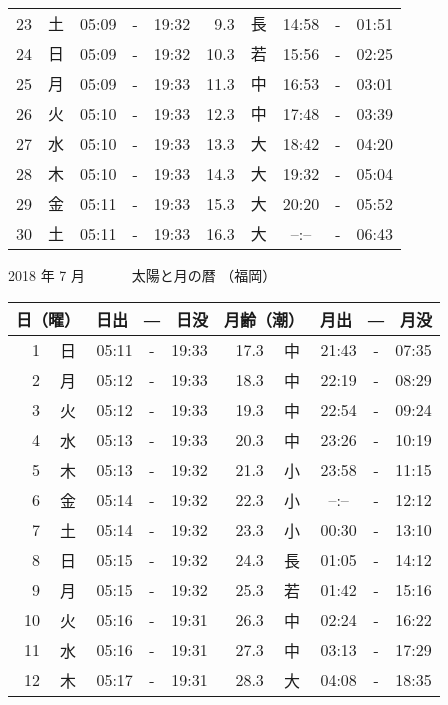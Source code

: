 \documentclass[a4j,10pt]{jsarticle}
\begin{document}
\begin{center}
\begin{table}[ht]
\begin{center}
\begin{tabular}{|rc|ccc|rc|ccc|}
 23 & 土 & 05:09 &-& 19:32 &  9.3 & 長 & 14:58 &-& 01:51 \\
 24 & 日 & 05:09 &-& 19:32 & 10.3 & 若 & 15:56 &-& 02:25 \\
 25 & 月 & 05:09 &-& 19:33 & 11.3 & 中 & 16:53 &-& 03:01 \\
 26 & 火 & 05:10 &-& 19:33 & 12.3 & 中 & 17:48 &-& 03:39 \\
 27 & 水 & 05:10 &-& 19:33 & 13.3 & 大 & 18:42 &-& 04:20 \\
 28 & 木 & 05:10 &-& 19:33 & 14.3 & 大 & 19:32 &-& 05:04 \\
 29 & 金 & 05:11 &-& 19:33 & 15.3 & 大 & 20:20 &-& 05:52 \\
 30 & 土 & 05:11 &-& 19:33 & 16.3 & 大 &  --:--  &-& 06:43 \\
    \hline
    \end{tabular}
    \end{center}
\end{table}
\newpage
  {\large 2018 年  7 月}
  {\Large 　　　太陽と月の暦   （福岡） }
  \begin{table}[ht]
  \begin{center}
     \begin{tabular}{|rc|ccc|rc|ccc|}
     \hline
     \multicolumn{2}{|c|}{日（曜）} & \multicolumn{3}{c|}{日出　―　日没} & \multicolumn{2}{c|}{月齢（潮）} & \multicolumn{3}{c|}{月出　―　月没}\\
     \hline
  1 & 日 & 05:11 &-& 19:33 & 17.3 & 中 & 21:43 &-& 07:35 \\
  2 & 月 & 05:12 &-& 19:33 & 18.3 & 中 & 22:19 &-& 08:29 \\
  3 & 火 & 05:12 &-& 19:33 & 19.3 & 中 & 22:54 &-& 09:24 \\
  4 & 水 & 05:13 &-& 19:33 & 20.3 & 中 & 23:26 &-& 10:19 \\
  5 & 木 & 05:13 &-& 19:32 & 21.3 & 小 & 23:58 &-& 11:15 \\
  6 & 金 & 05:14 &-& 19:32 & 22.3 & 小 &  --:--  &-& 12:12 \\
  7 & 土 & 05:14 &-& 19:32 & 23.3 & 小 & 00:30 &-& 13:10 \\
  8 & 日 & 05:15 &-& 19:32 & 24.3 & 長 & 01:05 &-& 14:12 \\
  9 & 月 & 05:15 &-& 19:32 & 25.3 & 若 & 01:42 &-& 15:16 \\
 10 & 火 & 05:16 &-& 19:31 & 26.3 & 中 & 02:24 &-& 16:22 \\
 11 & 水 & 05:16 &-& 19:31 & 27.3 & 中 & 03:13 &-& 17:29 \\
 12 & 木 & 05:17 &-& 19:31 & 28.3 & 大 & 04:08 &-& 18:35 \\

\end{tabular}
\end{center}
\end{table}
\end{center}
\end{document}
